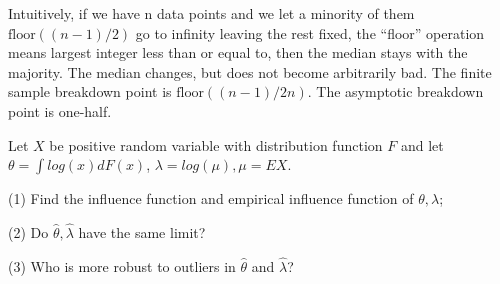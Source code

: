 \begin{solution}
Intuitively\citep{Charles2006}, if we have n data points and we let a minority of them $\text{floor}((n - 1)/2)$ go to infinity leaving the rest fixed, the ``floor'' operation means largest integer less than or equal to, then the median stays with the majority. The median changes, but does not become arbitrarily bad. The finite sample breakdown point is $\text{floor}((n - 1)/2n)$. The asymptotic breakdown point is one-half.
\end{solution}





\begin{problem}
    Let $X$ be positive random variable with distribution function $F$ and let $\theta = \int log(x) d F(x)$, $\lambda = log (\mu), \mu = EX$. 

    (1) Find the influence function and empirical influence function of $\theta,\lambda$;

    (2) Do $\hat\theta,\hat\lambda$ have the same limit?

    (3) Who is more robust to outliers in $\hat\theta$ and $\hat\lambda$?
\end{problem}

